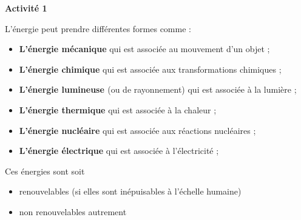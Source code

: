 \documentclass[10pt]{article}
\begin{document}
\begin{mybox}{\textbf{Activité 1}}
    \setlength\parindent{4pt} %
    \setlength\parskip{5pt} 

    L’énergie peut prendre différentes formes comme :
    \begin{itemize}
        \item \textbf{\color{DarkRed} {L’énergie mécanique}} qui est associée au mouvement d’un objet ;
        \item \textbf{\color{DarkRed} {L’énergie chimique}} qui est associée aux transformations chimiques ;
        \item \textbf{\color{DarkRed} {L’énergie lumineuse }}(ou de rayonnement) qui est associée à la lumière ;
        \item \textbf{\color{DarkRed} {L’énergie thermique}} qui est associée à la chaleur ;
        \item \textbf{\color{DarkRed} {L’énergie nucléaire}} qui est associée aux réactions nucléaires ;
        \item \textbf{\color{DarkRed} {L’énergie électrique}} qui est associée à l'électricité ;
    \end{itemize}

    Ces énergies sont soit \begin{itemize}
        \item renouvelables (si elles sont inépuisables à l'échelle humaine)
        \item non renouvelables autrement
    \end{itemize}

\end{mybox}

\vspace{-5pt}
\end{document}

